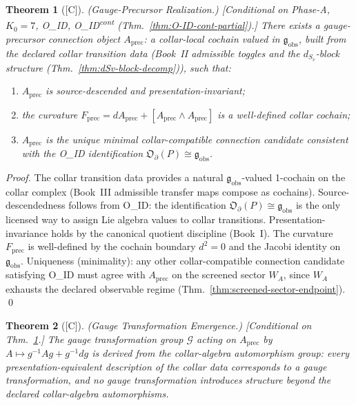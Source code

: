 \documentclass[12pt,oneside]{amsbook}
\theoremstyle{plain}
\newtheorem{theorem}{Theorem}[section]
\theoremstyle{definition}
\theoremstyle{remark}
\newcommand{\status}[1]{\textup{[#1]}}
\begin{document}
\begin{theorem}[\status{C}]\label{thm:gauge-precursor-realization}
\textup{(Gauge-Precursor Realization.)}
\textup{[Conditional on Phase-A, $K_0=7$, O\_ID, O\_ID\textsuperscript{cont}
(Thm.~\ref{thm:O-ID-cont-partial}).]}
There exists a gauge-precursor connection object $A_{\mathrm{prec}}$:
a collar-local cochain valued in $\mathfrak{g}_{\mathrm{obs}}$,
built from the declared collar transition data (Book~II admissible
toggles and the $d_{S_v}$-block structure
(Thm.~\ref{thm:dSv-block-decomp})), such that:
\begin{enumerate}[label=\textup{(\arabic*)}]
 \item $A_{\mathrm{prec}}$ is source-descended and presentation-invariant;
 \item the curvature $F_{\mathrm{prec}} = dA_{\mathrm{prec}} +
 [A_{\mathrm{prec}} \wedge A_{\mathrm{prec}}]$ is a well-defined
 collar cochain;
 \item $A_{\mathrm{prec}}$ is the unique minimal collar-compatible
 connection candidate consistent with the O\_ID identification
 $\mathfrak{O}_\partial(P) \cong \mathfrak{g}_{\mathrm{obs}}$.
\end{enumerate}
\end{theorem}

\begin{proof}
The collar transition data provides a natural $\mathfrak{g}_{\mathrm{obs}}$-valued
1-cochain on the collar complex (Book~III admissible transfer maps
compose as cochains). Source-descendedness follows from O\_ID:
the identification $\mathfrak{O}_\partial(P) \cong
\mathfrak{g}_{\mathrm{obs}}$ is the only licensed way to assign Lie
algebra values to collar transitions. Presentation-invariance holds
by the canonical quotient discipline (Book~I). The curvature
$F_{\mathrm{prec}}$ is well-defined by the cochain boundary
$d^2 = 0$ and the Jacobi identity on $\mathfrak{g}_{\mathrm{obs}}$.
Uniqueness (minimality): any other collar-compatible connection
candidate satisfying O\_ID must agree with $A_{\mathrm{prec}}$ on
the screened sector $W_A$, since $W_A$ exhausts the declared
observable regime (Thm.~\ref{thm:screened-sector-endpoint}). \qed
\end{proof}

\begin{theorem}[\status{C}]\label{thm:gauge-transformation-emergence}
\textup{(Gauge Transformation Emergence.)}
\textup{[Conditional on Thm.~\ref{thm:gauge-precursor-realization}.]}
The gauge transformation group $\mathcal{G}$ acting on
$A_{\mathrm{prec}}$ by $A \mapsto g^{-1}Ag + g^{-1}dg$
is derived from the collar-algebra automorphism group: every
presentation-equivalent description of the collar data corresponds
to a gauge transformation, and no gauge transformation introduces
structure beyond the declared collar-algebra automorphisms.
\end{theorem}
\end{document}
